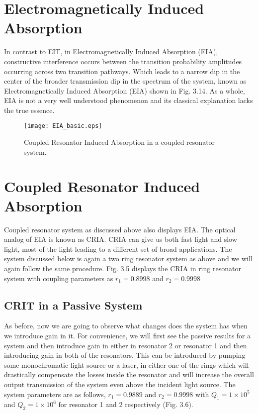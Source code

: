 \section{Electromagnetically Induced Absorption}
In contrast to EIT, in Electromagnetically Induced Absorption (EIA), constructive interference occurs between the transition probability amplitudes occurring across two transition pathways. Which leads to a narrow dip in the center of the broader transmission dip in the spectrum of the system, known as Electromagnetically Induced Absorption (EIA) shown in Fig. 3.14. As a whole, EIA is not a very well understood phenomenon and its classical explanation lacks the true essence.

\begin{figure}[h]
\centering
\texttt{[image: EIA\_basic.eps]}
\caption{Coupled Resonator Induced Absorption in a coupled resonator system.}
\end{figure}

\section{Coupled Resonator Induced Absorption} 
 
Coupled resonator system as discussed above also displays EIA. The optical analog of EIA is known as CRIA. CRIA can give us both fast light and slow light, most of the light leading to a different set of broad applications. The system discussed below is again a two ring resonator system as above and we will again follow the same procedure. Fig. 3.5 displays the CRIA in ring resonator system with coupling parameters as $r_{1} = 0.8998$ and $r_{2} = 0.9998$


\subsection{CRIT in a Passive System}
As before, now we are going to observe what changes does the system has when we introduce gain in it. For convenience, we will first see the passive results for a system and then introduce gain in either in resonator 2 or resonator 1 and then introducing gain in both of the resonators. This can be introduced by pumping some monochromatic light source or a laser, in either one of the rings which will drastically compensate the losses inside the resonator and will increase the overall output transmission of the system even above the incident light source. The system parameters are as follows, $r_{1} = 0.9889$ and $r_{2} = 0.9998$ with $Q_{1} = 1\times10^{5}$ and $Q_{2} = 1\times10^{6}$ for resonator 1 and 2 respectively (Fig. 3.6). 

